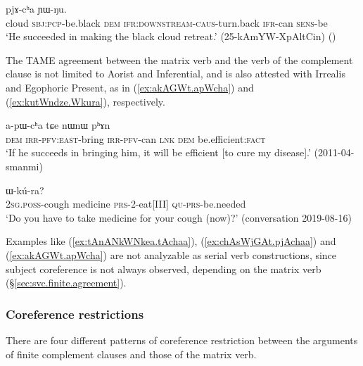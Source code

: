 \begin{exe}
\ex \label{ex:chAsWjGAt.pjAchaa}
  pjɤ-cʰa ɲɯ-ŋu. \\
 cloud \textsc{sbj}:\textsc{pcp}-be.black \textsc{dem} \textsc{ifr}:\textsc{downstream}-\textsc{caus}-turn.back \textsc{ifr}-can \textsc{sens}-be \\
 \glt `He succeeded in making the black cloud retreat.' (25-kAmYW-XpAltCin)
()
 \end{exe}
 
The TAME agreement between the matrix verb and the verb of the complement clause is not limited to Aorist and Inferential, and is also attested with Irrealis and Egophoric Present, as in (\ref{ex:akAGWt.apWcha}) and (\ref{ex:kutWndze.Wkura}), respectively.

\begin{exe}
\ex \label{ex:akAGWt.apWcha}
  a-pɯ-cʰa tɕe nɯnɯ pʰɤn \\
 \textsc{dem} \textsc{irr}-\textsc{pfv}:\textsc{east}-bring \textsc{irr}-\textsc{pfv}-can \textsc{lnk} \textsc{dem} be.efficient:\textsc{fact} \\
 \glt `If he succeeds in bringing him, it will be efficient [to cure my disease].' (2011-04-smanmi)
 \end{exe}
 
\begin{exe}
\ex \label{ex:kutWndze.Wkura}
  ɯ-kú-ra? \\
 \textsc{2sg}.\textsc{poss}-cough medicine \textsc{prs}-2-eat[III] \textsc{qu}-\textsc{prs}-be.needed \\
 \glt `Do you have to take medicine for your cough (now)?' (conversation 2019-08-16)
 \end{exe} 
 
 Examples like (\ref{ex:tAnANkWNkea.tAchaa}), (\ref{ex:chAsWjGAt.pjAchaa}) and (\ref{ex:akAGWt.apWcha}) are not analyzable as serial verb constructions, since subject coreference is not always observed, depending on the matrix verb (§\ref{sec:svc.finite.agreement}).
 
 \subsubsection{Coreference restrictions} \label{sec:finite.complement.coref}
There are four different patterns of coreference restriction between the arguments of finite complement clauses and those of the matrix verb.

